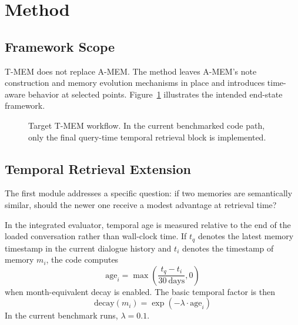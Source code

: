 \documentclass[conference]{IEEEtran}
\begin{document}
\section{Method}

\subsection{Framework Scope}

T-MEM does not replace A-MEM. The method leaves A-MEM's note construction and memory evolution mechanisms in place and introduces time-aware behavior at selected points. Figure~\ref{fig:workflow} illustrates the intended end-state framework.

\begin{figure}[htbp]
\centering
{}
\caption{Target T-MEM workflow. In the current benchmarked code path, only the final query-time temporal retrieval block is implemented.}
\label{fig:workflow}
\end{figure}

\subsection{Temporal Retrieval Extension}

The first module addresses a specific question: if two memories are semantically similar, should the newer one receive a modest advantage at retrieval time?

In the integrated evaluator, temporal age is measured relative to the end of the loaded conversation rather than wall-clock time. If $t_q$ denotes the latest memory timestamp in the current dialogue history and $t_i$ denotes the timestamp of memory $m_i$, the code computes
\begin{equation}
\text{age}_i = \max\!\left(\frac{t_q - t_i}{30\ \text{days}}, 0\right)
\end{equation}
when month-equivalent decay is enabled. The basic temporal factor is then
\begin{equation}
\text{decay}(m_i) = \exp(-\lambda \cdot \text{age}_i)
\end{equation}
In the current benchmark runs, $\lambda = 0.1$.
\end{document}
